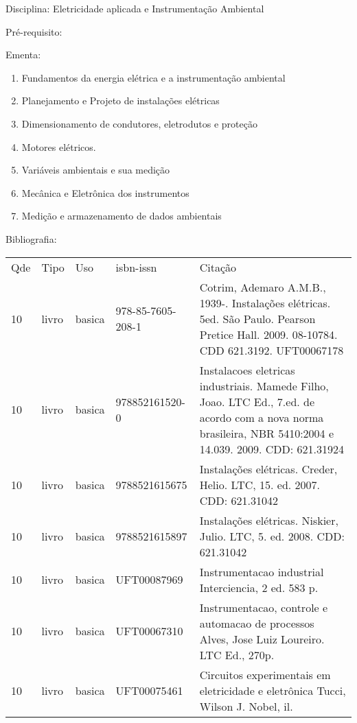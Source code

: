 \documentclass[12pt,a4paper,twoside]{report}
\begin{document}
Disciplina: Eletricidade aplicada e Instrumentação Ambiental

Pré-requisito:
\begin{enumerate}
\end{enumerate}

Ementa:
\begin{enumerate}
\item Fundamentos da energia elétrica e a instrumentação ambiental
\item Planejamento e Projeto de instalações elétricas
\item Dimensionamento de condutores, eletrodutos e proteção
\item Motores elétricos.
\item Variáveis ambientais e sua medição
\item Mecânica e Eletrônica dos instrumentos
\item Medição e armazenamento de dados ambientais
\end{enumerate}

Bibliografia:
\begin{tabular}{lllll}
Qde & Tipo & Uso & isbn-issn & Citação \\
10&livro&basica&978-85-7605-208-1&Cotrim, Ademaro A.M.B., 1939-. Instalações elétricas. 5ed. São Paulo. Pearson Pretice Hall. 2009. 08-10784. CDD 621.3192.  UFT00067178\\
10&livro&basica&978852161520-0&Instalacoes eletricas industriais. Mamede Filho, Joao. LTC Ed., 7.ed. de acordo com a nova norma brasileira, NBR 5410:2004 e 14.039. 2009. CDD: 621.31924\\
10&livro&basica&9788521615675&Instalações elétricas. Creder, Helio.  LTC,  15. ed. 2007. CDD: 621.31042\\
10&livro&basica&9788521615897&Instalações elétricas. Niskier, Julio.  LTC, 5. ed. 2008. CDD: 621.31042\\
10&livro&basica&UFT00087969&Instrumentacao industrial Interciencia, 2 ed. 583 p.\\
10&livro&basica&UFT00067310&Instrumentacao, controle e automacao de processos Alves, Jose Luiz Loureiro. LTC Ed., 270p.\\
10&livro&basica&UFT00075461&Circuitos experimentais em eletricidade e eletrônica Tucci, Wilson J. Nobel, il.\\
\end{tabular}
\end{document}
